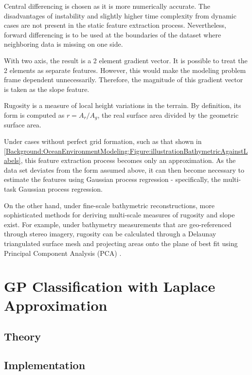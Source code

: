 			Central differencing is chosen as it is more numerically accurate. The disadvantages of instability and slightly higher time complexity from dynamic cases are not present in the static feature extraction process. Nevertheless, forward differencing is to be used at the boundaries of the dataset where neighboring data is missing on one side.
						
			With two axis, the result is a 2 element gradient vector. It is possible to treat the 2 elements as separate features. However, this would make the modeling problem frame dependent unnecessarily. Therefore, the magnitude of this gradient vector is taken as the slope feature. 
			
			Rugosity is a measure of local height variations in the terrain. By definition, its form is computed as $r = A_{r}/A_{g}$, the real surface area divided by the geometric surface area.
			
			Under cases without perfect grid formation, such as that shown in \cref{Background:OceanEnvironmentModeling:Figure:illustrationBathymetricAgainstLabels}, this feature extraction process becomes only an approximation. As the data set deviates from the form assumed above, it can then become necessary to estimate the features using Gaussian process regression - specifically, the multi-task Gaussian process regression. 
			
		 	On the other hand, under fine-scale bathymetric reconstructions, more sophisticated methods for deriving multi-scale measures of rugosity and slope exist. For example, under bathymetry measurements that are geo-referenced through stereo imagery, rugosity can be calculated through a Delaunay triangulated surface mesh and projecting areas onto the plane of best fit using Principal Component Analysis (PCA) \citep{StefanWilliams:Rugosity}.
							
			\FloatBarrier
				
	\section{GP Classification with Laplace Approximation}
	
		\subsection{Theory}
		
		\subsection{Implementation}
		

